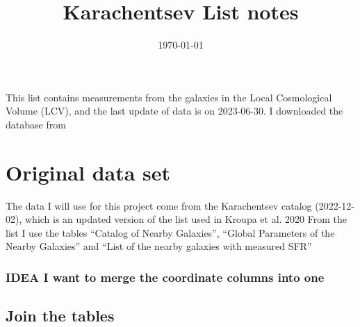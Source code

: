 \documentclass[11pt]{article}
\date{\today}
\title{Karachentsev List notes}
\begin{document}
\maketitle
\tableofcontents

This list contains measurements from the galaxies in the Local Cosmological Volume (LCV), and the last update of data is on 2023-06-30. I downloaded the database from \autocite{karachentsevUPDATEDNEARBYGALAXY2013}

\section{Original data set}
\label{sec:orgbd60bab}

The data I will use for this project come from the Karachentsev  catalog (2022-12-02), which is an updated version of the list used in Kroupa et al. 2020
From the list I use the tables ``Catalog of Nearby Galaxies'', ``Global Parameters of the Nearby Galaxies'' and ``List of the nearby galaxies with measured SFR''


\subsubsection{{\bfseries\sffamily IDEA} I want to merge the coordinate columns into one}
\label{sec:org9296394}

\subsection{Join the tables}
\label{sec:org3cf69e8}
\end{document}
